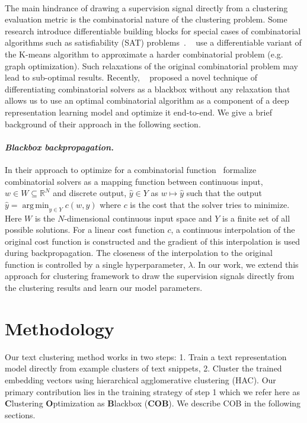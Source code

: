 \documentclass[11pt,a4paper]{article}
\DeclareMathOperator*{\argmin}{arg\,min}
\begin{document}
\paragraph{}The main hindrance of drawing a supervision signal directly from a clustering evaluation metric is the combinatorial nature of the clustering problem. Some research introduce differentiable building blocks for special cases of combinatorial algorithms such as satisfiability (SAT) problems~\citep{wang2019satnet}. ~\citet{wilder2019end} use a differentiable variant of the K-means algorithm to approximate a harder combinatorial problem (e.g. graph optimization). Such relaxations of the original combinatorial problem may lead to sub-optimal results. Recently, ~\citet{vlastelica2019differentiation} proposed a novel technique of differentiating combinatorial solvers as a blackbox without any relaxation that allows us to use an optimal combinatorial algorithm as a component of a deep representation learning model and optimize it end-to-end. We give a brief background of their approach in the following section.

\paragraph{\textit{Blackbox backpropagation.}}\label{sec:bb} In their approach to optimize for a combinatorial function~\citet{vlastelica2019differentiation} formalize combinatorial solvers as a mapping function between continuous input, ${w \in W \subseteq \mathbb{R}^N}$ and discrete output, ${\hat{y} \in Y}$ as ${w \mapsto \hat{y}}$ such that the output ${\hat{y}=\argmin_{y \in Y} c(w,y)}$ where $c$ is the cost that the solver tries to minimize. Here $W$ is the $N$-dimensional continuous input space and $Y$ is a finite set of all possible solutions. For a linear cost function $c$, a continuous interpolation of the original cost function is constructed and the gradient of this interpolation is used during backpropagation. The closeness of the interpolation to the original function is controlled by a single hyperparameter, $\lambda$. In our work, we extend this approach for clustering framework to draw the supervision signals directly from the clustering results and learn our model parameters.

\section{Methodology}
Our text clustering method works in two steps: 1. Train a text representation model directly from example clusters of text snippets, 2. Cluster the trained embedding vectors using hierarchical agglomerative clustering (HAC). Our primary contribution lies in the training strategy of step 1 which we refer here as \textbf{C}lustering \textbf{O}ptimization as \textbf{B}lackbox (\textbf{COB}). We describe COB in the following sections.
\end{document}

